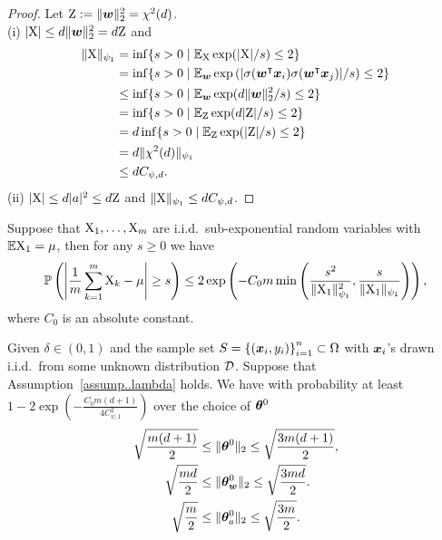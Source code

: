 \documentclass{article}
\begin{document}
\begin{proof}
    Let
    $\textnormal{Z}:=\lVert\bm{w}\rVert^2_2=\chi^2(d)$.\\
    (i)   $\lvert\textnormal{X}\rvert\leq d\lVert\bm{w}\rVert^2_2=d\textnormal{Z}$ and
    \begin{equation*}
        \begin{aligned}
            \lVert\textnormal{X}\rVert_{\psi_1}
             & =\inf\{s>0\mid\mathbb{E}_{\textnormal{X}}\exp(\lvert\textnormal{X}\rvert/s)\leq 2\}                                               \\
             & =\inf\{s>0\mid\mathbb{E}_{\bm{w}}\exp\left(\lvert\sigma(\bm{w}^\intercal\bm{x}_i)\sigma(\bm{w}^\intercal\bm{x}_j)\rvert/s\right)\leq 2\} \\
             & \leq\inf\{s>0\mid\mathbb{E}_{\bm{w}}\exp(d\lVert\bm{w}\rVert^2_2/s)\leq 2\}                                      \\
             & =\inf\{s>0\mid\mathbb{E}_{\textnormal{Z}}\exp(d\lvert\textnormal{Z}\rvert/s)\leq 2\}                                              \\
             & =d\inf\{s>0\mid\mathbb{E}_{\textnormal{Z}}\exp(\lvert\textnormal{Z}\rvert/s)\leq 2\}                                              \\
             & =d\lVert\chi^2(d)\rVert_{\psi_1}                                                                     \\
             & \leq dC_{\psi,d}.
        \end{aligned}
    \end{equation*}
    (ii) $\lvert\textnormal{X}\rvert\leq d\lvert a\rvert^2\leq d\textnormal{Z}$ and $\lVert\textnormal{X}\rVert_{\psi_1}\leq dC_{\psi,d}$.
\end{proof}
\begin{thm}\label{thm:sub_exp}
    Suppose that $\textnormal{X}_1,\ldots,\textnormal{X}_m$ are i.i.d.\ sub-exponential random variables with $\mathbb{E}\textnormal{X}_1=\mu$, then for any $s\geq 0$ we have
    \begin{equation}
        \mathbb{P}\left(\left\lvert\frac{1}{m}\sum_{k=1}^m\textnormal{X}_k-\mu\right\rvert\geq s\right)\leq 2\exp\left(-C_0 m \min\left(\frac{s^2}{\lVert\textnormal{X}_1\rVert^2_{\psi_1}},\frac{s}{\lVert\textnormal{X}_1\rVert_{\psi_1}}\right)\right),
    \end{equation}
    where $C_0$ is an absolute constant.
\end{thm}
\begin{prop}\label{prop..InitialThetaNorm}
    Given $\delta\in(0,1)$ and the sample set $S = {\{(\bm{x}_i, y_i)\}}_{i=1}^n\subset\Omega$ with $\bm{x}_i$'s drawn i.i.d.\ from some unknown distribution $\mathcal{D}$. Suppose that Assumption~\ref{assump..lambda} holds. We have with probability at least $1-2\exp\left(-\frac{C_0m(d+1)}{4C^2_{\psi,1}}\right)$ over the choice of $\bm{\theta}^0$
    \begin{align}
        \sqrt{\frac{m(d+1)}{2}}
        &\leq \lVert\bm{\theta}^0\rVert_2\leq \sqrt{\frac{3m(d+1)}{2}},\label{eq..InitialThetaNorm}\\
        \sqrt{\frac{md}{2}}
        &\leq \lVert\bm{\theta}_{\bm{w}}^0\rVert_2\leq \sqrt{\frac{3md}{2}}.\label{eq..InitialThetavwNorm}\\
        \sqrt{\frac{m}{2}}
        &\leq \lVert\bm{\theta}_{a}^0\rVert_2\leq \sqrt{\frac{3m}{2}}.\label{eq..InitialThetaaNorm}
    \end{align}
\end{prop}
\end{document}
